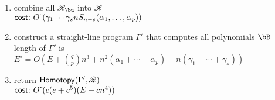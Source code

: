 \documentclass[12pt]{article}
\begin{document}
\begin{algorithm}[!h]
\begin{enumerate}
\begin{enumerate}
\end{enumerate}
\item combine all $\scrR_\bu$ into $\mathscr{R}$\\
  $\text{\sf{cost:~}} {O}{\,\tilde{ }\,}(\gamma_1 \cdots \gamma_s n S_{n-s}(\alpha_1,\dots,\alpha_p))$

\item construct a straight-line program $\Gamma'$ that computes all polynomials $\bB$\\
  length of $\Gamma'$ is $E'=O(E + {q \choose p} n^3 + n^2
(\alpha_1+\cdots+\alpha_p) + n(\gamma_1 + \cdots + \gamma_s))$

\item return $\mathsf{Homotopy}(\Gamma',\mathscr{R})$\\
 $\text{\sf{cost:~}} {O}{\,\tilde{ }\,}( c(e+c^5 )(E + cn^4) )$
\end{enumerate}
\label{Row}
\end{algorithm}


 
\end{document}
